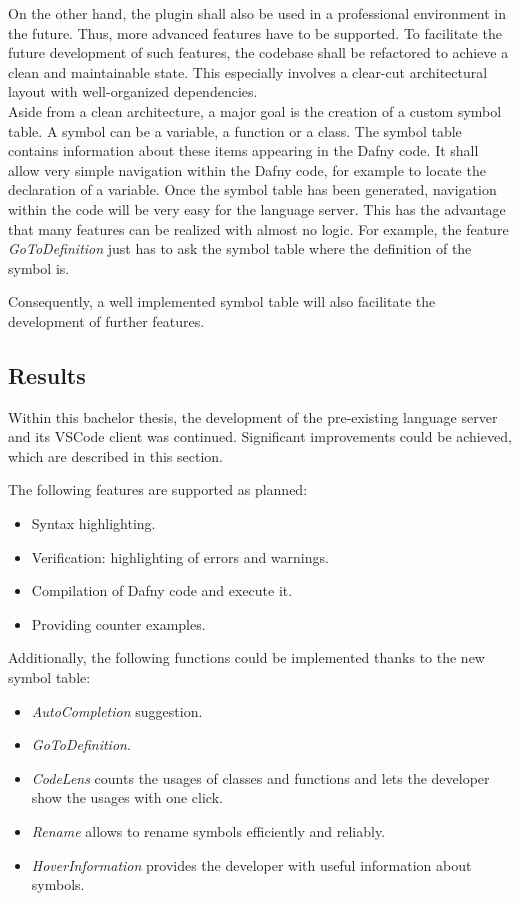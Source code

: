On the other hand, the plugin shall also be used in a professional environment in the future.
Thus, more advanced features have to be supported.
To facilitate the future development of such features, the codebase shall be refactored to achieve a clean and maintainable state.
This especially involves a clear-cut architectural layout with well-organized dependencies.\\

Aside from a clean architecture, a major goal is the creation of a custom symbol table.
A symbol can be a variable, a function or a class.
The symbol table contains information about these items appearing in the Dafny code.
It shall allow very simple navigation within the Dafny code, for example to locate the declaration of a variable.
Once the symbol table has been generated, navigation within the code will be very easy for the language server.
This has the advantage that many features can be realized with almost no logic.
For example, the feature \textit{\textit{GoToDefinition}} just has to ask the symbol table where the definition of the symbol is.

Consequently, a well implemented symbol table will also facilitate the development of further features.

\subsection{Results}
Within this bachelor thesis, the development of the pre-existing language server and its VSCode client was continued.
Significant improvements could be achieved, which are described in this section.

The following features are supported as planned:
\begin{itemize}
    \item Syntax highlighting.
    \item Verification: highlighting of errors and warnings.
    \item Compilation of Dafny code and execute it.
    \item Providing counter examples.
\end{itemize}

Additionally, the following functions could be implemented thanks to the new symbol table: 
\begin{itemize}
    \item \textit{AutoCompletion} suggestion.
    \item \textit{GoToDefinition}.
    \item \textit{CodeLens} counts the usages of classes and functions and lets the developer show the usages with one click.
    \item \textit{Rename} allows to rename symbols efficiently and reliably.
    \item \textit{HoverInformation} provides the developer with useful information about symbols.
\end{itemize}

